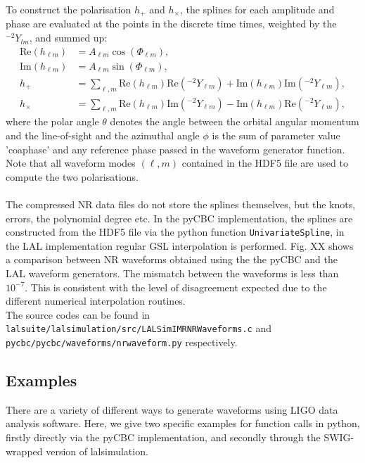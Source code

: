 \documentclass[aps,prd,amssymb,amsmath,amsfonts,superscriptaddress,
floatfix ,preprintnumbers,altaffilletter]{revtex4}
\begin{document}
To construct the polarisation $h_+$ and $h_\times$, the splines for each amplitude and phase are evaluated at the points in the discrete time times, 
weighted by the ${}^{-2}Y_{lm}$, and summed up:
\begin{align}
\label{}
    \mathrm{Re}(h_{\ell m}) &= A_{\ell m} \cos(\Phi_{\ell m}),   \\
    \mathrm{Im}(h_{\ell m}) &= A_{\ell m} \sin(\Phi_{\ell m}),   \\
    h_+ &= \sum_{\ell, m} \mathrm{Re}(h_{\ell m}) \mathrm{Re}({}^{-2}Y_{\ell m}) + \mathrm{Im}(h_{\ell m}) \mathrm{Im}({}^{-2}Y_{\ell m}), \\
    h_\times &= \sum_{\ell, m} \mathrm{Re}(h_{\ell m}) \mathrm{Im}({}^{-2}Y_{\ell m}) - \mathrm{Im}(h_{\ell m}) \mathrm{Re}({}^{-2}Y_{\ell m}),
\end{align}
where the polar angle $\theta$ denotes the angle between the orbital angular momentum and the line-of-sight and the azimuthal
angle $\phi$ is the sum of parameter value 'coa\textunderscore phase' and any reference phase passed in the waveform generator function.
\\
Note that all waveform modes $(\ell, m)$ contained in the HDF5 file are used
to compute the two polarisations. \\
\\
The compressed NR data files do not store the splines themselves, but the knots, errors, the polynomial degree etc. In the pyCBC implementation,
the splines are constructed from the HDF5 file via the python function \texttt{UnivariateSpline}, in the LAL implementation regular GSL interpolation
is performed. Fig. XX shows a comparison between NR waveforms obtained using the the pyCBC and the LAL waveform generators. The mismatch
between the waveforms is less than $10^{-7}$. This is consistent with the level of disagreement expected due to the different numerical interpolation
routines. \\
The source codes can be found in \texttt{lalsuite/lalsimulation/src/LALSimIMRNRWaveforms.c} and 
\texttt{pycbc/pycbc/waveforms/nr\textunderscore waveform.py} respectively.

\subsection{Examples}
There are a variety of different ways to generate waveforms using LIGO data analysis software. Here, we give two specific examples
for function calls in python, firstly directly via the pyCBC implementation, and secondly through the SWIG-wrapped version of 
lalsimulation. 
\end{document}
